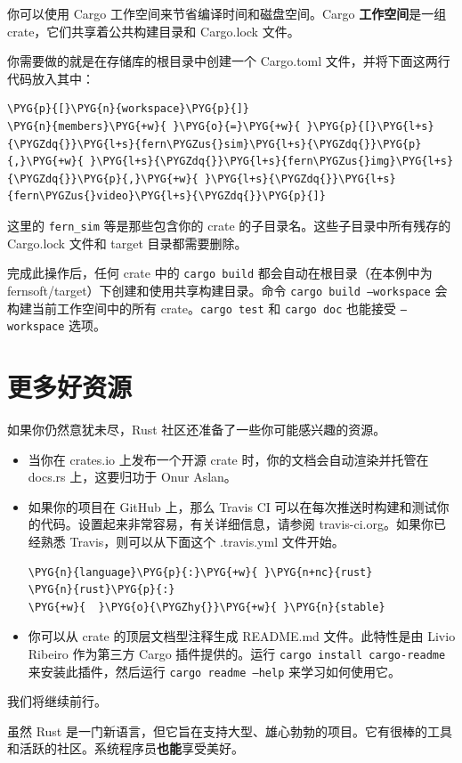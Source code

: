 你可以使用 Cargo 工作空间来节省编译时间和磁盘空间。Cargo \textbf{工作空间}是一组 crate，它们共享着公共构建目录和 Cargo.lock 文件。

你需要做的就是在存储库的根目录中创建一个 Cargo.toml 文件，并将下面这两行代码放入其中：

\begin{Verbatim}[commandchars=\\\{\},breaklines=true,breakanywhere=true,fontsize=\codefont,xleftmargin=17bp]
\PYG{p}{[}\PYG{n}{workspace}\PYG{p}{]}
\PYG{n}{members}\PYG{+w}{ }\PYG{o}{=}\PYG{+w}{ }\PYG{p}{[}\PYG{l+s}{\PYGZdq{}}\PYG{l+s}{fern\PYGZus{}sim}\PYG{l+s}{\PYGZdq{}}\PYG{p}{,}\PYG{+w}{ }\PYG{l+s}{\PYGZdq{}}\PYG{l+s}{fern\PYGZus{}img}\PYG{l+s}{\PYGZdq{}}\PYG{p}{,}\PYG{+w}{ }\PYG{l+s}{\PYGZdq{}}\PYG{l+s}{fern\PYGZus{}video}\PYG{l+s}{\PYGZdq{}}\PYG{p}{]}
\end{Verbatim}

这里的 \texttt{fern\_sim} 等是那些包含你的 crate 的子目录名。这些子目录中所有残存的 Cargo.lock 文件和 target 目录都需要删除。

完成此操作后，任何 crate 中的 \texttt{cargo build} 都会自动在根目录（在本例中为 fernsoft/\allowbreak{}target）下创建和使用共享构建目录。命令 \texttt{cargo build --workspace} 会构建当前工作空间中的所有 crate。\texttt{cargo test} 和 \texttt{cargo doc} 也能接受 \texttt{--workspace} 选项。

\section{更多好资源}

如果你仍然意犹未尽，Rust 社区还准备了一些你可能感兴趣的资源。

\begin{itemize}
\item 当你在 crates.io 上发布一个开源 crate 时，你的文档会自动渲染并托管在 docs.rs 上，这要归功于 Onur Aslan。
\item 如果你的项目在 GitHub 上，那么 Travis CI 可以在每次推送时构建和测试你的代码。设置起来非常容易，有关详细信息，请参阅 travis-ci.org。如果你已经熟悉 Travis，则可以从下面这个 .travis.yml 文件开始。

\begin{Verbatim}[commandchars=\\\{\},breaklines=true,breakanywhere=true,fontsize=\codefont,xleftmargin=17bp]
\PYG{n}{language}\PYG{p}{:}\PYG{+w}{ }\PYG{n+nc}{rust}
\PYG{n}{rust}\PYG{p}{:}
\PYG{+w}{  }\PYG{o}{\PYGZhy{}}\PYG{+w}{ }\PYG{n}{stable}
\end{Verbatim}

\item 你可以从 crate 的顶层文档型注释生成 README.md 文件。此特性是由 Livio Ribeiro 作为第三方 Cargo 插件提供的。运行 \texttt{cargo install cargo-readme} 来安装此插件，然后运行 \texttt{cargo readme --help} 来学习如何使用它。
\end{itemize}

我们将继续前行。

虽然 Rust 是一门新语言，但它旨在支持大型、雄心勃勃的项目。它有很棒的工具和活跃的社区。系统程序员\textbf{也能}享受美好。

